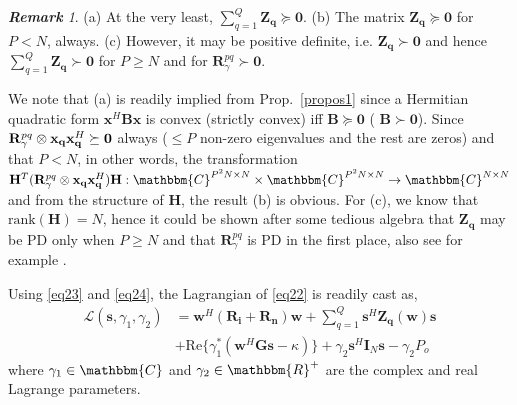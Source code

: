 \documentclass[11pt,draftclsnofoot,onecolumn]{IEEEtran}
\theoremstyle{definition}
\theoremstyle{remark}
\newtheorem{remk}{\bf Remark}
\begin{document}
\begin{remk} \label{PSDremark}
(a) At the very least, $\sum\limits_{q=1}^Q\mathbf{Z_q}\succeq \mathbf{0}$.  (b) The matrix $\mathbf{Z_q}\succeq \mathbf{0}$ for $P<N$, always.  (c) However, it may be positive definite, i.e. $\mathbf{Z_q}\succ\mathbf{0}$  and hence $\sum\limits_{q=1}^Q\mathbf{Z_q}\succ\mathbf{0}$ for $P\geq N$ and for $\mathbf{R}_\gamma^{pq}\succ \mathbf{0}$.
\end{remk}

We note that (a) is readily implied from Prop.~\ref{propos1} since  a Hermitian quadratic form $\mathbf{x}^H\mathbf{B}\mathbf{x}$ is convex (strictly convex) iff $\mathbf{B}\succeq\mathbf{0}$ ( $\mathbf{B}\succ\mathbf{0}$). Since $\mathbf{R}_{\gamma}^{pq}\otimes \mathbf{x_q}\mathbf{x}_{\bf q}^H \succeq \mathbf{0}$ always ($\leq P$ non-zero eigenvalues and the rest are zeros) and that $P<N$, in other words, the transformation $\mathbf{H}^T(\mathbf{R}_{\gamma}^{pq}\otimes \mathbf{x_q}\mathbf{x}_{\bf q}^H)\mathbf{H}:\mathbbm{C}^{P^2 N\times N} \times \mathbbm{C}^{P^2 N\times N} \rightarrow \mathbbm{C}^{N\times N}$ and from the structure of $\mathbf{H}$, the result (b) is obvious. For (c), we know that $\mathrm{rank}(\mathbf{H})=N$, hence it could be shown after some tedious algebra that $\mathbf{Z_q}$ may be PD only when $P\geq N$ and that $\mathbf{R}_{\gamma}^{pq}$ is PD in the first place, also see for example \cite[pg. 399]{horn1994}.


Using \eqref{eq23} and \eqref{eq24}, the Lagrangian of \eqref{eq22} is readily cast as,
\begin{align} \label{eq25}
\mathcal{L}(\mathbf{s},\gamma_1,\gamma_2)&=\mathbf{w}^H( \mathbf{R_i+R_n})\mathbf{w}+\sum\limits_{q=1}^Q\mathbf{s}^H\mathbf{Z_q}(\mathbf{w})\mathbf{s} \\
&+\mbox{Re}\{ \gamma_1^{\ast} (\mathbf{w}^H\mathbf{G}\mathbf{s}-\kappa)\}+\gamma_2\mathbf{s}^H\mathbf{I}_N\mathbf{s}-\gamma_2P_o \nonumber
\end{align}
where $\gamma_1\in\mathbbm{C}$ and $\gamma_2\in\mathbbm{R}^{+}$ are the complex and real Lagrange parameters.
\end{document}
